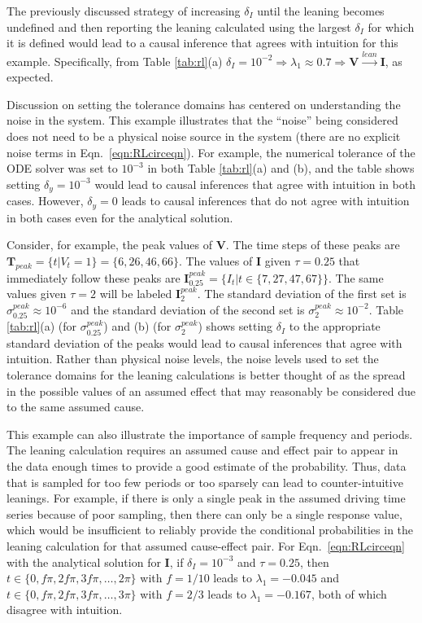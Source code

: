 \documentclass[twocolumn,aps,pre,groupedaddress]{revtex4-1}
\begin{document}
The previously discussed strategy of increasing $\delta_I$ until the leaning becomes undefined and then reporting the leaning calculated using the largest $\delta_I$ for which it is defined would lead to a causal inference that agrees with intuition for this example.  Specifically, from Table \ref{tab:rl}(a) $\delta_I=10^{-2}\Rightarrow\lambda_1\approx 0.7\Rightarrow\mathbf{V}\xrightarrow{lean}\mathbf{I}$, as expected.  

Discussion on setting the tolerance domains has centered on understanding the noise in the system.  This example illustrates that the ``noise'' being considered does not need to be a physical noise source in the system (there are no explicit noise terms in Eqn.\ \ref{eqn:RLcirceqn}).  For example, the numerical tolerance of the ODE solver was set to $10^{-3}$ in both Table \ref{tab:rl}(a) and (b), and the table shows setting $\delta_y=10^{-3}$ would lead to causal inferences that agree with intuition in both cases.  However, $\delta_y=0$ leads to causal inferences that do not agree with intuition in both cases even for the analytical solution.  

Consider, for example, the peak values of $\mathbf{V}$.  The time steps of these peaks are $\mathbf{T}_{peak} = \{t|V_t =1\} = \{6,26,46,66\}$.  The values of $\mathbf{I}$ given $\tau = 0.25$ that immediately follow these peaks are $\mathbf{I}^{peak}_{0.25} = \{I_t|t\in\{7,27,47,67\}\}$.  The same values given $\tau=2$ will be labeled $\mathbf{I}^{peak}_2$.  The standard deviation of the first set is $\sigma_{0.25}^{peak} \approx 10^{-6}$ and the standard deviation of the second set is $\sigma_{2}^{peak} \approx 10^{-2}$.  Table \ref{tab:rl}(a) (for $\sigma_{0.25}^{peak}$) and (b) (for $\sigma_{2}^{peak}$) shows setting $\delta_I$ to the appropriate standard deviation of the peaks would lead to causal inferences that agree with intuition.  Rather than physical noise levels, the noise levels used to set the tolerance domains for the leaning calculations is better thought of as the spread in the possible values of an assumed effect that may reasonably be considered due to the same assumed cause.  
    
This example can also illustrate the importance of sample frequency and periods.  The leaning calculation requires an assumed cause and effect pair to appear in the data enough times to provide a good estimate of the probability.  Thus, data that is sampled for too few periods or too sparsely can lead to counter-intuitive leanings.  For example, if there is only a single peak in the assumed driving time series because of poor sampling, then there can only be a single response value, which would be insufficient to reliably provide the conditional probabilities in the leaning calculation for that assumed cause-effect pair.  For Eqn.\ \ref{eqn:RLcirceqn} with the analytical solution for $\mathbf{I}$, if $\delta_I=10^{-3}$ and $\tau = 0.25$, then $t\in\{0,f\pi,2f\pi,3f\pi,\ldots,2\pi\}$ with $f=1/10$ leads to $\lambda_1 = -0.045$ and $t\in\{0,f\pi,2f\pi,3f\pi,\ldots,3\pi\}$ with $f=2/3$ leads to $\lambda_1 = -0.167$, both of which disagree with intuition.
\end{document}

